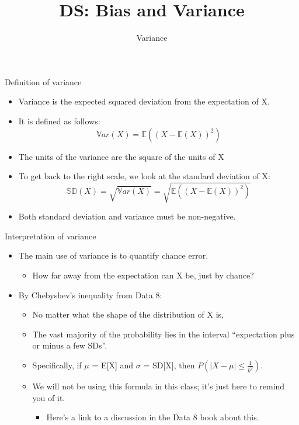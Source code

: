 \documentclass[aspectratio=169]{../latex_main/tntbeamer}  %
\title[Introduction]{DS: Bias and Variance}
\subtitle{Variance}
\begin{document}
	
	\maketitle
	\begin{frame}{Definition of variance}
	    \begin{itemize}
	        \item Variance is the expected squared deviation from the expectation of X.
	        \item It is defined as follows:
	        \begin{equation*}
	            \mathbb{V}ar(X) = \mathbb{E}((X - \mathbb{E}(X))^2)
	        \end{equation*}
	        \item The units of the variance are the square of the units of X
	        \item To get back to the right scale, we look at the standard deviation of X:
	        \begin{equation*}
	            \mathbb{SD}(X)  = \sqrt{\mathbb{V}ar(X)}  =\sqrt{\mathbb{E}((X - \mathbb{E}(X))^2)}
	        \end{equation*}
	        \item Both standard deviation and variance must be non-negative.
	    \end{itemize}
	\end{frame}
	
	
	\begin{frame}[c]{Interpretation of variance}
	    \begin{itemize}
	        \item The main use of variance is to quantify chance error.
	        \begin{itemize}
	            \item How far away from the expectation can X be, just by chance?
	        \end{itemize}
	        \item By Chebyshev’s inequality from Data 8:
	        \begin{itemize}
	            \item No matter what the shape of the distribution of X is,
	            \item The vast majority of the probability lies in the interval “expectation plus or minus a few SDs”.
	            \item Specifically, if   $\mu$  = E[X] and    $\sigma$   = SD[X], then $P(|X - \mu| \leq \frac{1}{k^2})$.   
	            \item We will not be using this formula in this class; it’s just here to remind you of it.
	            \begin{itemize}
	                \item Here’s a link to a discussion in the Data 8 book about this.
	            \end{itemize}
	        \end{itemize}
	    \end{itemize}
	\end{frame}
	
\end{document}
